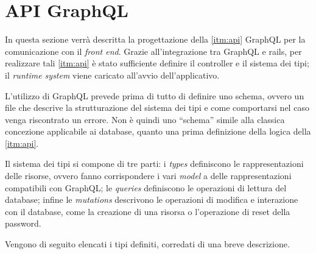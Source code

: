\section{API GraphQL}
In questa sezione verrà descritta la progettazione della \ref{itm:api} GraphQL per la comunicazione con il \textit{front end}. Grazie all'integrazione tra GraphQL e rails, per realizzare tali \ref{itm:api} è stato sufficiente definire il controller e il sistema dei tipi; il \textit{runtime system} viene caricato all'avvio dell'applicativo.

L'utilizzo di GraphQL prevede prima di tutto di definire uno schema, ovvero un file che descrive la strutturazione del sistema dei tipi e come comportarsi nel caso venga riscontrato un errore. Non è quindi uno ``schema'' simile alla classica concezione applicabile ai database, quanto una prima definizione della logica della \ref{itm:api}.

Il sistema dei tipi si compone di tre parti: i \textit{types} definiscono le rappresentazioni delle risorse, ovvero fanno corrispondere i vari \textit{model} a delle rappresentazioni compatibili con GraphQL; le \textit{queries} definiscono le operazioni di lettura del database; infine le \textit{mutations} descrivono le operazioni di modifica e interazione con il database, come la creazione di una risorsa o l'operazione di reset della password.

Vengono di seguito elencati i tipi definiti, corredati di una breve descrizione.
